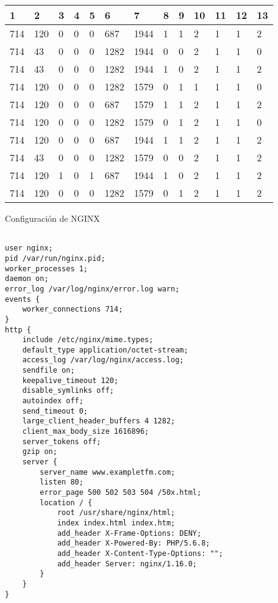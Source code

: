 \begin{table}[H]
\begin{tabular}{|l|l|l|l|l|l|l|l|l|l|l|l|l|}
\hline
\textbf{1} & \textbf{2} & \textbf{3} & \textbf{4} & \textbf{5} & \textbf{6} & \textbf{7} & \textbf{8} & \textbf{9} & \textbf{10} & \textbf{11} & \textbf{12} & \textbf{13} \\ \hline
714  &  120  &  0  &  0  &  0  &  687  &  1944  &  1  &  1  &  2  &  1  &  1  &  2 \\ \hline
714  &  43  &  0  &  0  &  0  &  1282  &  1944  &  0  &  0  &  2  &  1  &  1  &  0 \\ \hline
714  &  43  &  0  &  0  &  0  &  1282  &  1944  &  1  &  0  &  2  &  1  &  1  &  2 \\ \hline
714  &  120  &  0  &  0  &  0  &  1282  &  1579  &  0  &  1  &  1  &  1  &  1  &  0 \\ \hline
714  &  120  &  0  &  0  &  0  &  687  &  1579  &  1  &  1  &  2  &  1  &  1  &  2 \\ \hline
714  &  120  &  0  &  0  &  0  &  1282  &  1579  &  0  &  1  &  2  &  1  &  1  &  0 \\ \hline
714  &  120  &  0  &  0  &  0  &  687  &  1944  &  1  &  1  &  2  &  1  &  1  &  2 \\ \hline
714  &  43  &  0  &  0  &  0  &  1282  &  1579  &  0  &  0  &  2  &  1  &  1  &  2 \\ \hline
714  &  120  &  1  &  0  &  1  &  687  &  1944  &  1  &  0  &  2  &  1  &  1  &  2 \\ \hline
714  &  120  &  0  &  0  &  0  &  1282  &  1579  &  0  &  1  &  2  &  1  &  1  &  2 \\ \hline
\end{tabular}
\end{table}
Configuración de NGINX
\begin{lstlisting}[label={lst:nginx_config_random},caption={Configuración de NGINX tras 5 generaciones}]

user nginx;
pid /var/run/nginx.pid;
worker_processes 1;
daemon on;
error_log /var/log/nginx/error.log warn;
events {
    worker_connections 714;
}
http {
    include /etc/nginx/mime.types;
    default_type application/octet-stream;
    access_log /var/log/nginx/access.log;
    sendfile on;
    keepalive_timeout 120;
    disable_symlinks off;
    autoindex off;
    send_timeout 0;
    large_client_header_buffers 4 1282;
    client_max_body_size 1616896;
    server_tokens off;
    gzip on;
    server {
        server_name www.exampletfm.com;
        listen 80;
        error_page 500 502 503 504 /50x.html;
        location / {
            root /usr/share/nginx/html;
            index index.html index.htm;
            add_header X-Frame-Options: DENY;
            add_header X-Powered-By: PHP/5.6.8;
            add_header X-Content-Type-Options: "";
            add_header Server: nginx/1.16.0;
        }
    }
}
\end{lstlisting}

